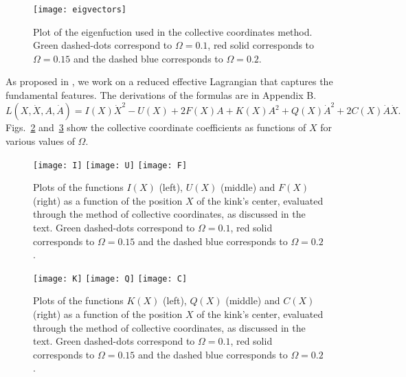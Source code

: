 \documentclass[vecphys]{svmult}		%
\begin{document}
\begin{figure}[h]
\begin{center}
	\texttt{[image: eigvectors]}
	
 \caption{Plot of the eigenfuction used in the collective coordinates method. Green dashed-dots correspond to $\Omega=0.1$, red solid corresponds to $\Omega=0.15$ and the dashed blue corresponds to $\Omega=0.2$.}
	\label{eigenvectors}
\end{center}
\end{figure}
 

As proposed in \cite{sugiyama}, we work on a reduced effective Lagrangian that captures the fundamental features. The derivations of the formulas are in Appendix B.
\begin{equation}\label{lag1}
L(X,\dot{X}, A, \dot{A})=I(X)\dot{X}^2-U(X)+2F(X)A + K(X)A^2 + Q(X)\dot{A}^2 + 2C(X)\dot{A}\dot{X}.
\end{equation}
Figs.~\ref{I_U_F} and~\ref{K_Q_C} show the collective coordinate coefficients as functions of $X$ for various values of $\Omega$.



\begin{figure}[h]
\begin{center}
	\texttt{[image: I]}
	\texttt{[image: U]}
	\texttt{[image: F]}	
	\caption{Plots of the functions $I(X)$ (left), $U(X)$ (middle)
  and $F(X)$ (right) as a function of the position $X$ of the kink's
center, evaluated through the method of collective coordinates, as discussed in the text. Green dashed-dots correspond to $\Omega=0.1$, red solid corresponds to $\Omega=0.15$ and the dashed blue corresponds to $\Omega=0.2$.}
	\label{I_U_F}
\end{center}
\end{figure}

\begin{figure}[h]
\begin{center}
	\texttt{[image: K]}
	\texttt{[image: Q]}
	\texttt{[image: C]}		
	\caption{Plots of the functions $K(X)$ (left), $Q(X)$ (middle)
  and $C(X)$ (right) as a function of the position $X$ of the kink's
center, evaluated through the method of collective coordinates, as discussed in the text. Green dashed-dots correspond to $\Omega=0.1$, red solid corresponds to $\Omega=0.15$ and the dashed blue corresponds to $\Omega=0.2$.}
	\label{K_Q_C}
	\end{center}
\end{figure}
\end{document}
